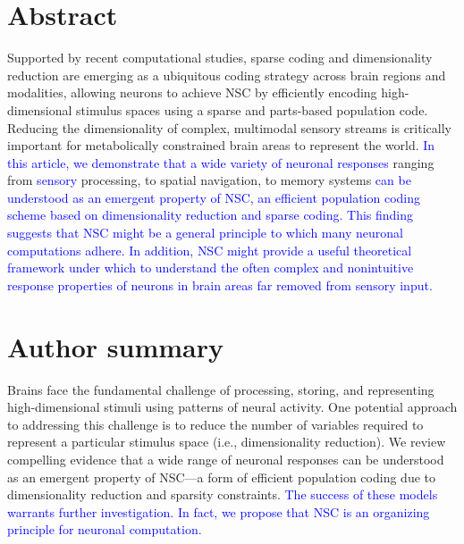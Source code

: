 \documentclass[10pt,letterpaper]{article}
\newcommand{\revise}[1]{\textcolor{blue}{#1}}
\begin{document}
\section*{Abstract}
Supported by recent computational studies, sparse coding and dimensionality reduction are emerging as a ubiquitous coding strategy  across brain regions and modalities, allowing neurons to achieve \acf{NSC} by efficiently encoding high-dimensional stimulus spaces using a sparse and parts-based population code. Reducing the dimensionality of complex, multimodal sensory streams is critically important for metabolically constrained brain areas to represent the world.
\revise{In this article, we demonstrate that a wide variety of neuronal responses}
ranging from \revise{sensory} processing, to spatial navigation, to memory systems
\revise{can be understood as an emergent property of \acs{NSC},
an efficient population coding scheme
based on dimensionality reduction and sparse coding.}
\revise{This finding suggests that \acs{NSC} might be a general principle
to which many neuronal computations adhere.
In addition, \acs{NSC} might provide a useful theoretical framework under which
to understand the often complex and nonintuitive response properties
of neurons in brain areas far removed from sensory input.}



\section*{Author summary}
Brains face the fundamental challenge of processing, storing, and representing high-dimensional stimuli using patterns of neural activity. One potential approach to addressing this challenge is to reduce the number of variables required to represent a particular stimulus space (i.e., dimensionality reduction).
We review compelling evidence that a wide range of neuronal responses can be understood as an emergent property of \acf{NSC}---a form of efficient population coding due to dimensionality reduction and sparsity constraints.
\revise{The success of these models warrants further investigation.
In fact, we propose that \acs{NSC} is an organizing principle for neuronal computation.}

\linenumbers









\nolinenumbers


\appendix


\end{document}
